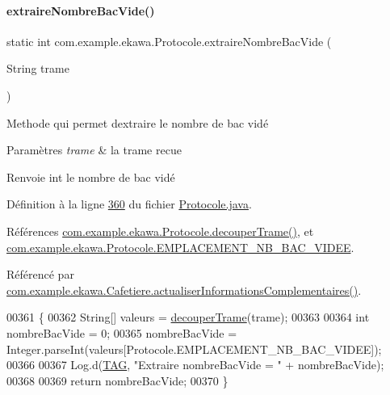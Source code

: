\paragraph{\texorpdfstring{extraire\+Nombre\+Bac\+Vide()}{extraireNombreBacVide()}}
{\footnotesize\ttfamily static int com.\+example.\+ekawa.\+Protocole.\+extraire\+Nombre\+Bac\+Vide (\begin{DoxyParamCaption}\item[{String}]{trame }\end{DoxyParamCaption})\hspace{0.3cm}{\ttfamily [static]}}



Methode qui permet d\textquotesingle{}extraire le nombre de bac vidé 


\begin{DoxyParams}{Paramètres}
{\em trame} & la trame recue \\
\hline
\end{DoxyParams}
\begin{DoxyReturn}{Renvoie}
int le nombre de bac vidé 
\end{DoxyReturn}


Définition à la ligne \hyperlink{_protocole_8java_source_l00360}{360} du fichier \hyperlink{_protocole_8java_source}{Protocole.\+java}.



Références \hyperlink{_protocole_8java_source_l00208}{com.\+example.\+ekawa.\+Protocole.\+decouper\+Trame()}, et \hyperlink{_protocole_8java_source_l00065}{com.\+example.\+ekawa.\+Protocole.\+E\+M\+P\+L\+A\+C\+E\+M\+E\+N\+T\+\_\+\+N\+B\+\_\+\+B\+A\+C\+\_\+\+V\+I\+D\+EE}.



Référencé par \hyperlink{_cafetiere_8java_source_l00574}{com.\+example.\+ekawa.\+Cafetiere.\+actualiser\+Informations\+Complementaires()}.


\begin{DoxyCode}
00361     \{
00362         String[] valeurs = \hyperlink{classcom_1_1example_1_1ekawa_1_1_protocole_a23c261e4ab5ad3c2ac60187f04ae40ea}{decouperTrame}(trame);
00363 
00364         \textcolor{keywordtype}{int} nombreBacVide = 0;
00365         nombreBacVide = Integer.parseInt(valeurs[Protocole.EMPLACEMENT\_NB\_BAC\_VIDEE]);
00366 
00367         Log.d(\hyperlink{classcom_1_1example_1_1ekawa_1_1_protocole_ae9b68fa0daac528421b887f19413f8f5}{TAG}, \textcolor{stringliteral}{"Extraire nombreBacVide = "} + nombreBacVide);
00368 
00369         \textcolor{keywordflow}{return} nombreBacVide;
00370     \}
\end{DoxyCode}
\mbox{\label{classcom_1_1example_1_1ekawa_1_1_protocole_ad76b79c64aaa9abed9a1219f3f28cb9a}} 
